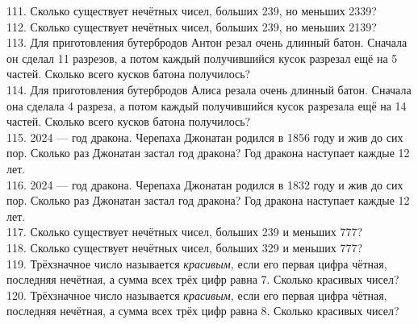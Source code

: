 111. Сколько существует нечётных чисел, больших 239, но меньших 2339?\\
112. Сколько существует нечётных чисел, больших 239, но меньших 2139?\\
113. Для приготовления бутербродов Антон резал очень длинный батон. Сначала он сделал 11 разрезов, а потом каждый получившийся кусок разрезал ещё на 5 частей. Сколько всего кусков батона получилось?\\
114. Для приготовления бутербродов Алиса резала очень длинный батон. Сначала она сделала 4 разреза, а потом каждый получившийся кусок разрезала ещё на 14 частей. Сколько всего кусков батона получилось?\\
115. 2024 --- год дракона. Черепаха Джонатан родился в 1856 году и жив до сих пор. Сколько раз Джонатан застал год дракона? Год дракона наступает каждые 12 лет.\\
116. 2024 --- год дракона. Черепаха Джонатан родился в 1832 году и жив до сих пор. Сколько раз Джонатан застал год дракона? Год дракона наступает каждые 12 лет.\\
117. Сколько существует нечётных чисел, больших 239 и меньших 777?\\
118. Сколько существует нечётных чисел, больших 329 и меньших 777?\\
119. Трёхзначное число называется {\it красивым,} если его первая цифра чётная, последняя нечётная, а сумма всех трёх цифр равна 7. Сколько красивых чисел?\\
120. Трёхзначное число называется {\it красивым,} если его первая цифра чётная, последняя нечётная, а сумма всех трёх цифр равна 8. Сколько красивых чисел?
\newpage
